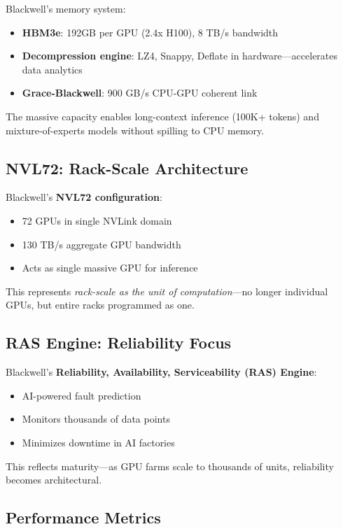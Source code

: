 \documentclass{article}
\begin{document}
Blackwell's memory system:
\begin{itemize}
\item \textbf{HBM3e}: 192GB per GPU (2.4x H100), 8 TB/s bandwidth
\item \textbf{Decompression engine}: LZ4, Snappy, Deflate in hardware—accelerates data analytics
\item \textbf{Grace-Blackwell}: 900 GB/s CPU-GPU coherent link
\end{itemize}

The massive capacity enables long-context inference (100K+ tokens) and mixture-of-experts models without spilling to CPU memory.

\subsection{NVL72: Rack-Scale Architecture}

Blackwell's \textbf{NVL72 configuration}:
\begin{itemize}
\item 72 GPUs in single NVLink domain
\item 130 TB/s aggregate GPU bandwidth
\item Acts as single massive GPU for inference
\end{itemize}

This represents \textit{rack-scale as the unit of computation}—no longer individual GPUs, but entire racks programmed as one.

\subsection{RAS Engine: Reliability Focus}

Blackwell's \textbf{Reliability, Availability, Serviceability (RAS) Engine}:
\begin{itemize}
\item AI-powered fault prediction
\item Monitors thousands of data points
\item Minimizes downtime in AI factories
\end{itemize}

This reflects maturity—as GPU farms scale to thousands of units, reliability becomes architectural.

\subsection{Performance Metrics}
\end{document}
